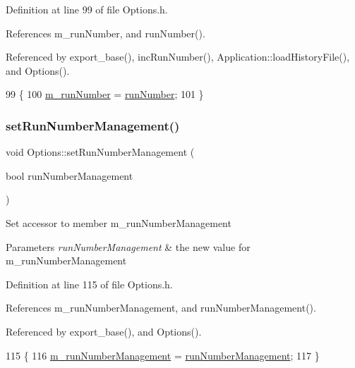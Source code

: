 Definition at line 99 of file Options.\+h.



References m\+\_\+run\+Number, and run\+Number().



Referenced by export\+\_\+base(), inc\+Run\+Number(), Application\+::load\+History\+File(), and Options().


\begin{DoxyCode}
99                                                     \{
100                 \hyperlink{classOptions_a1762c644c5f87feabe12f84f17a1a351}{m\_runNumber} = \hyperlink{classOptions_a2d9447919fe90f9ce8df5530526cbb27}{runNumber};
101         \}
\end{DoxyCode}
\mbox{\label{classOptions_a7bf3fb2833021f8900eb105b0a9c02c5}} 
\subsubsection{\texorpdfstring{set\+Run\+Number\+Management()}{setRunNumberManagement()}}
{\footnotesize\ttfamily void Options\+::set\+Run\+Number\+Management (\begin{DoxyParamCaption}\item[{bool}]{run\+Number\+Management }\end{DoxyParamCaption})\hspace{0.3cm}{\ttfamily [inline]}}

Set accessor to member m\+\_\+run\+Number\+Management 
\begin{DoxyParams}{Parameters}
{\em run\+Number\+Management} & the new value for m\+\_\+run\+Number\+Management \\
\hline
\end{DoxyParams}


Definition at line 115 of file Options.\+h.



References m\+\_\+run\+Number\+Management, and run\+Number\+Management().



Referenced by export\+\_\+base(), and Options().


\begin{DoxyCode}
115                                                                \{
116                 \hyperlink{classOptions_a2ad2d67b98fc5fbea4cbbd781ccb6183}{m\_runNumberManagement} = \hyperlink{classOptions_a7654a2c3d67baae08f61edc18bec367e}{runNumberManagement};
117         \}
\end{DoxyCode}
\mbox{\label{classOptions_a0d362af154c7d2e30a7bf340eb061fa5}} 
